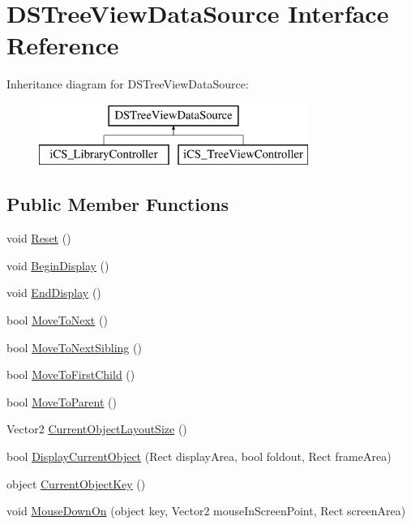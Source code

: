 \hypertarget{interface_d_s_tree_view_data_source}{\section{D\+S\+Tree\+View\+Data\+Source Interface Reference}
\label{interface_d_s_tree_view_data_source}
}
Inheritance diagram for D\+S\+Tree\+View\+Data\+Source\+:\begin{figure}[H]
\begin{center}
\leavevmode
\includegraphics[height=2.000000cm]{interface_d_s_tree_view_data_source}
\end{center}
\end{figure}
\subsection*{Public Member Functions}
\begin{DoxyCompactItemize}
\item 
void \hyperlink{interface_d_s_tree_view_data_source_a6a37c74306a0f65661f357fc4520b8be}{Reset} ()
\item 
void \hyperlink{interface_d_s_tree_view_data_source_aad29bc1ed4b7c542a2c78f9db5fe4f9d}{Begin\+Display} ()
\item 
void \hyperlink{interface_d_s_tree_view_data_source_a464358a348c57d5d5e266d29b03ba057}{End\+Display} ()
\item 
bool \hyperlink{interface_d_s_tree_view_data_source_a43f72b767bba94de3d771787393517d5}{Move\+To\+Next} ()
\item 
bool \hyperlink{interface_d_s_tree_view_data_source_a59f82146765e0bf493d8bf50aa0abaea}{Move\+To\+Next\+Sibling} ()
\item 
bool \hyperlink{interface_d_s_tree_view_data_source_a6fad036e26c98494e51642c23449dfa1}{Move\+To\+First\+Child} ()
\item 
bool \hyperlink{interface_d_s_tree_view_data_source_aefafa05430e1931245d8fc1d5039c294}{Move\+To\+Parent} ()
\item 
Vector2 \hyperlink{interface_d_s_tree_view_data_source_a61672678788adbd07733db8455c45417}{Current\+Object\+Layout\+Size} ()
\item 
bool \hyperlink{interface_d_s_tree_view_data_source_a010c661cc5c2fab3327aa4fed1b61b66}{Display\+Current\+Object} (Rect display\+Area, bool foldout, Rect frame\+Area)
\item 
object \hyperlink{interface_d_s_tree_view_data_source_a204c5deac6b7a38c3b8413275c719df4}{Current\+Object\+Key} ()
\item 
void \hyperlink{interface_d_s_tree_view_data_source_a6b1bad83dd61d8ee85614af4ccb39810}{Mouse\+Down\+On} (object key, Vector2 mouse\+In\+Screen\+Point, Rect screen\+Area)
\end{DoxyCompactItemize}


